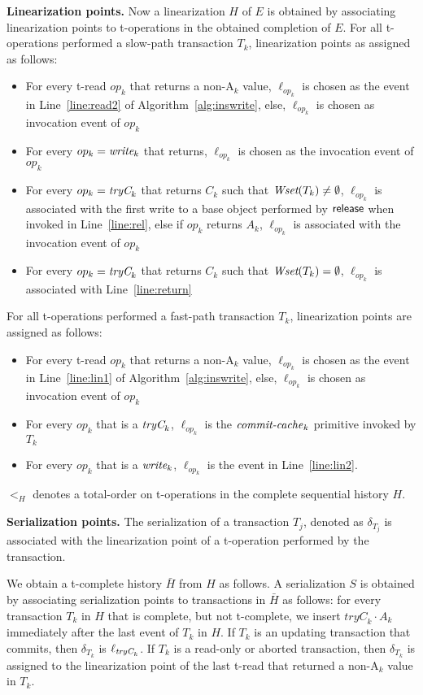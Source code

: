 \vspace{1mm}\noindent\textbf{Linearization points.}
Now a linearization $H$ of $E$ is obtained by associating linearization points to
t-operations in the obtained completion of $E$.
For all t-operations performed a slow-path transaction $T_k$, linearization points as assigned as follows:
%
\begin{itemize}
\item For every t-read $op_k$ that returns a non-A$_k$ value, $\ell_{op_k}$ is chosen as the event in Line~\ref{line:read2}
of Algorithm~\ref{alg:inswrite}, else, $\ell_{op_k}$ is chosen as invocation event of $op_k$
\item For every $op_k=\textit{write}_k$ that returns, $\ell_{op_k}$ is chosen as the invocation event of $op_k$
\item For every $op_k=\textit{tryC}_k$ that returns $C_k$ such that $\textit{Wset}(T_k)
  \neq \emptyset$, $\ell_{op_k}$ is associated with the first write to a base object performed by $\lit{release}$
  when invoked in Line~\ref{line:rel}, 
  else if $op_k$ returns $A_k$, $\ell_{op_k}$ is associated with the invocation event of $op_k$
\item For every $op_k=\textit{tryC}_k$ that returns $C_k$ such that $\textit{Wset}(T_k) = \emptyset$, 
$\ell_{op_k}$ is associated with Line~\ref{line:return}
\end{itemize}
%
For all t-operations performed a fast-path transaction $T_k$, linearization points are assigned as follows:
\begin{itemize}
\item For every t-read $op_k$ that returns a non-A$_k$ value, $\ell_{op_k}$ is chosen as the event in Line~\ref{line:lin1}
of Algorithm~\ref{alg:inswrite}, else, $\ell_{op_k}$ is chosen as invocation event of $op_k$
\item
For every $op_k$ that is a $\textit{tryC}_k$, $\ell_{op_k}$ is the $\ms{commit-cache}_k$ primitive invoked by $T_k$
\item
For every $op_k$ that is a $\textit{write}_k$, $\ell_{op_k}$ is the event in Line~\ref{line:lin2}.
\end{itemize}
%
$<_H$ denotes a total-order on t-operations in the complete sequential history $H$.

\vspace{1mm}\noindent\textbf{Serialization points.}
The serialization of a transaction $T_j$, denoted as $\delta_{T_j}$ is
associated with the linearization point of a t-operation 
performed by the transaction.

We obtain a t-complete history ${\bar H}$ from $H$ as follows. 
A serialization $S$ is obtained by associating serialization points to transactions in ${\bar H}$ as follows:
for every transaction $T_k$ in $H$ that is complete, but not t-complete, 
we insert $\textit{tryC}_k\cdot A_k$ immediately 
after the last event of $T_k$ in $H$. 
If $T_k$ is an updating transaction that commits, then $\delta_{T_k}$ is $\ell_{\textit{tryC}_k}$.
If $T_k$ is a read-only or aborted transaction,
then $\delta_{T_k}$ is assigned to the linearization point of the last t-read that returned a non-A$_k$ value in $T_k$.

